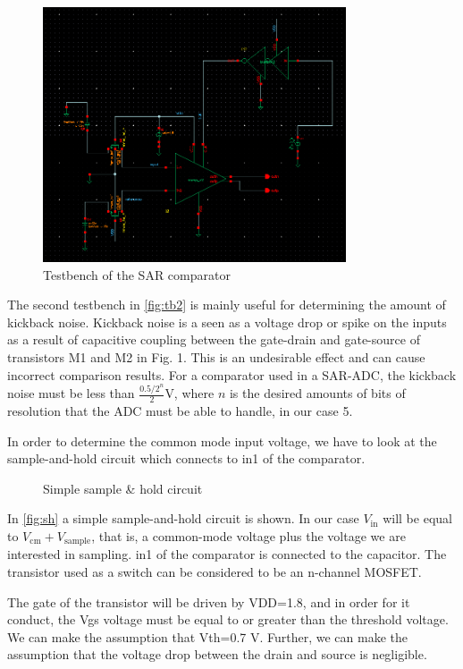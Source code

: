 \documentclass{article}
\newcommand*{\subb}[1]{\ensuremath{_{\mathrm{#1}}}}
\begin{document}
 \begin{figure}[!h]
  \centering
  \includegraphics[width=0.8\textwidth]{img/tb2}
  \caption{Testbench of the SAR comparator}
  \label{fig:tb2}
 \end{figure}

The second testbench in \autoref{fig:tb2} is mainly useful for determining the amount of kickback noise. Kickback noise is a seen as a voltage drop or spike on the inputs as a result of capacitive coupling between the gate-drain and gate-source of transistors M1 and M2 in Fig. 1. This is an undesirable effect and can cause incorrect comparison results. For a comparator used in a SAR-ADC, the kickback noise must be less than $\frac{0.5/2^n}{2}$V, where $n$ is the desired amounts of bits of resolution that the ADC must be able to handle, in our case 5.\bigskip

In order to determine the common mode input voltage, we have to look at the sample-and-hold circuit which connects to in1 of the comparator.

 \begin{figure}[!h]
  \centering
  
  \caption{Simple sample \& hold circuit}
  \label{fig:sh}
 \end{figure}
 
 In \autoref{fig:sh} a simple sample-and-hold circuit is shown. In our case $V\subb{in}$ will be equal to $V\subb{cm}+V\subb{sample}$, that is, a common-mode voltage plus the voltage we are interested in sampling. in1 of the comparator is connected to the capacitor. The transistor used as a switch can be considered to be an n-channel MOSFET.

 The gate of the transistor will be driven by VDD=1.8, and in order for it conduct, the Vgs voltage must be equal to or greater than the threshold voltage. We can make the assumption that Vth=0.7 V. Further, we can make the assumption that the voltage drop between the drain and source is negligible.
\end{document}
